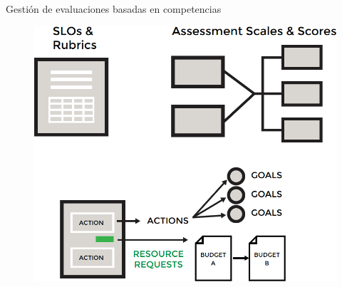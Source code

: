 \documentclass[10pt,xcolor=table ]{beamer}
\begin{document}
\begin{frame}{Gestión de evaluaciones basadas en competencias}
	\begin{figure}
		\centering
	    \includegraphics[scale=0.55]{../Figuras/ams/ams_3}
	\end{figure}
\end{frame}
\end{document}
